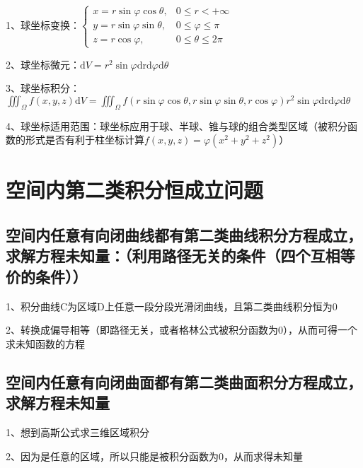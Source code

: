 1、球坐标变换：$\begin{cases}x=r \sin \varphi \cos \theta, & 0 \leqslant r<+\infty \\ y=r \sin \varphi \sin \theta, & 0 \leqslant \varphi \leqslant \pi \\ z=r \cos \varphi, & 0 \leqslant \theta \leqslant 2 \pi\end{cases}$

2、球坐标微元：$\mathrm{d} V=r^{2} \sin \varphi \mathrm{drd} \varphi \mathrm{d} \theta$

3、球坐标积分：$\iiint_{\Omega} f(x, y, z) \mathrm{d} V=\iiint_{\Omega} f(r \sin \varphi \cos \theta, r \sin \varphi \sin \theta, r \cos \varphi) r^{2} \sin \varphi \mathrm{drd} \varphi \mathrm{d} \theta$

4、球坐标适用范围：球坐标应用于球、半球、锥与球的组合类型区域（被积分函数的形式是否有利于柱坐标计算$f(x, y, z)=\varphi\left(x^{2}+y^{2}+z^{2}\right)$）

\section{空间内第二类积分恒成立问题}



\subsection{空间内任意有向闭曲线都有第二类曲线积分方程成立，求解方程未知量：（利用路径无关的条件（四个互相等价的条件））}

1、积分曲线C为区域D上任意一段分段光滑闭曲线，且第二类曲线积分恒为0

2、转换成偏导相等（即路径无关，或者格林公式被积分函数为0），从而可得一个求未知函数的方程



\subsection{空间内任意有向闭曲面都有第二类曲面积分方程成立，求解方程未知量}

1、想到高斯公式求三维区域积分

2、因为是任意的区域，所以只能是被积分函数为0，从而求得未知量



